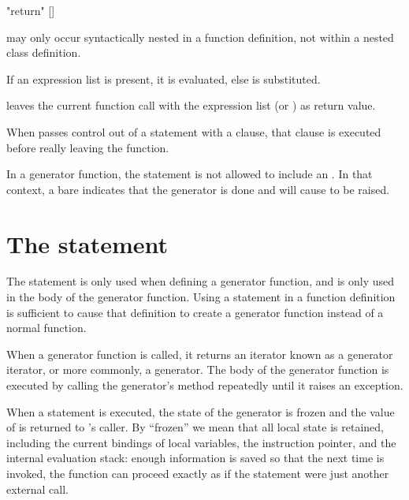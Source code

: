 \begin{productionlist}
             {"return" []}
\end{productionlist}

 may only occur syntactically nested in a function
definition, not within a nested class definition.

If an expression list is present, it is evaluated, else 
is substituted.

 leaves the current function call with the expression
list (or ) as return value.

When  passes control out of a  statement
with a  clause, that  clause is executed
before really leaving the function.

In a generator function, the  statement is not allowed
to include an .  In that context, a bare
 indicates that the generator is done and will cause
 to be raised.


\section{The  statement \label{yield}}

\begin{productionlist}
             {}
\end{productionlist}


The  statement is only used when defining a generator
function, and is only used in the body of the generator function.
Using a  statement in a function definition is
sufficient to cause that definition to create a generator function
instead of a normal function.

When a generator function is called, it returns an iterator known as a generator
iterator, or more commonly, a generator.  The body of the generator function is
executed by calling the generator's  method repeatedly until
it raises an exception.

When a  statement is executed, the state of the generator is
frozen and the value of  is returned to
's caller.  By ``frozen'' we mean that all local state is
retained, including the current bindings of local variables, the instruction
pointer, and the internal evaluation stack: enough information is saved so that
the next time  is invoked, the function can proceed exactly
as if the  statement were just another external call.

